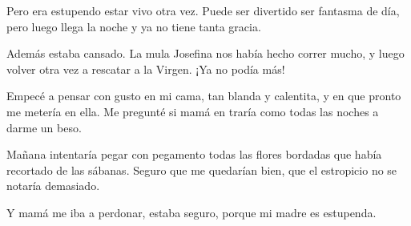 \documentclass{barcodevapor3pags}
\begin{document}
Pero era estupendo estar vivo otra vez. Puede ser divertido ser fantasma
de día, pero luego llega la noche y ya no tiene tanta gracia.~

Además estaba cansado. La mula Josefina nos había hecho correr mucho, y
luego volver otra vez a rescatar a la Virgen. ¡Ya no podía más!~

Empecé a pensar con gusto en mi cama, tan blanda y calentita, y en que
pronto me metería en ella. Me pregunté si mamá en traría como todas las
noches a darme un beso.~

Mañana intentaría pegar con pegamento todas las flores bordadas que
había recortado de las sábanas. Seguro que me quedarían bien, que el
estropicio no se notaría demasiado.~

Y mamá me iba a perdonar, estaba seguro, porque mi madre es estupenda.
\end{document}
